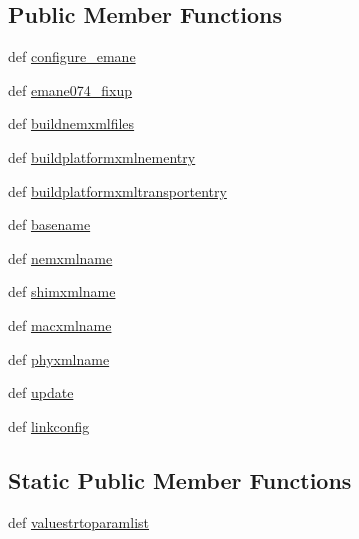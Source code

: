 \subsection*{Public Member Functions}
\begin{DoxyCompactItemize}
\item 
def \hyperlink{classcore_1_1emane_1_1emane_1_1_emane_model_a7080d1c32a8bd058c3b7ddc26f79217f}{configure\+\_\+emane}
\item 
def \hyperlink{classcore_1_1emane_1_1emane_1_1_emane_model_a4981a087e089f8884179d26f6d08db44}{emane074\+\_\+fixup}
\item 
def \hyperlink{classcore_1_1emane_1_1emane_1_1_emane_model_a3173d8501c7ad0692fccb7af466e6b59}{buildnemxmlfiles}
\item 
def \hyperlink{classcore_1_1emane_1_1emane_1_1_emane_model_a306de2565f3b0b0ebbf0ea0e6c918eda}{buildplatformxmlnementry}
\item 
def \hyperlink{classcore_1_1emane_1_1emane_1_1_emane_model_a081afd65576a68a35d94df59f42090f2}{buildplatformxmltransportentry}
\item 
def \hyperlink{classcore_1_1emane_1_1emane_1_1_emane_model_a7bb5a24b5eb8394814771b1f02955310}{basename}
\item 
def \hyperlink{classcore_1_1emane_1_1emane_1_1_emane_model_a8e664a518b35fcbe18b60ec1f515c052}{nemxmlname}
\item 
def \hyperlink{classcore_1_1emane_1_1emane_1_1_emane_model_afc3ef4f5b5a6abd8fd6d26e0d1d713d3}{shimxmlname}
\item 
def \hyperlink{classcore_1_1emane_1_1emane_1_1_emane_model_a192fa6bab37d6d350736ea94555f63aa}{macxmlname}
\item 
def \hyperlink{classcore_1_1emane_1_1emane_1_1_emane_model_a9135d46e2b41e51fb670437ffa5d02fc}{phyxmlname}
\item 
def \hyperlink{classcore_1_1emane_1_1emane_1_1_emane_model_a43465b2da988a69cefb96b14497d22d9}{update}
\item 
def \hyperlink{classcore_1_1emane_1_1emane_1_1_emane_model_a81f0dda8282173d903b095d3c6d6b47d}{linkconfig}
\end{DoxyCompactItemize}
\subsection*{Static Public Member Functions}
\begin{DoxyCompactItemize}
\item 
def \hyperlink{classcore_1_1emane_1_1emane_1_1_emane_model_aff313ecdbfa92447ed9ee5d37169a8df}{valuestrtoparamlist}
\end{DoxyCompactItemize}
